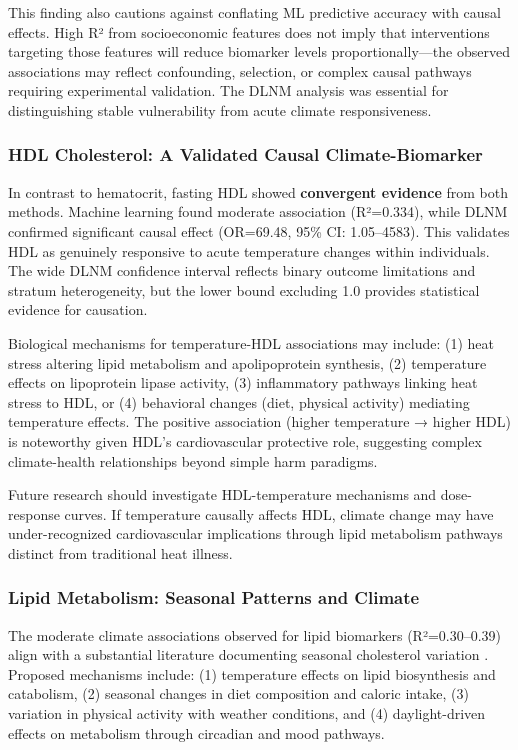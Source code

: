 This finding also cautions against conflating ML predictive accuracy with causal effects. High R² from socioeconomic features does not imply that interventions targeting those features will reduce biomarker levels proportionally---the observed associations may reflect confounding, selection, or complex causal pathways requiring experimental validation. The DLNM analysis was essential for distinguishing stable vulnerability from acute climate responsiveness.

\subsubsection{HDL Cholesterol: A Validated Causal Climate-Biomarker}

In contrast to hematocrit, fasting HDL showed \textbf{convergent evidence} from both methods. Machine learning found moderate association (R²=0.334), while DLNM confirmed significant causal effect (OR=69.48, 95\% CI: 1.05--4583). This validates HDL as genuinely responsive to acute temperature changes within individuals. The wide DLNM confidence interval reflects binary outcome limitations and stratum heterogeneity, but the lower bound excluding 1.0 provides statistical evidence for causation.

Biological mechanisms for temperature-HDL associations may include: (1) heat stress altering lipid metabolism and apolipoprotein synthesis, (2) temperature effects on lipoprotein lipase activity, (3) inflammatory pathways linking heat stress to HDL, or (4) behavioral changes (diet, physical activity) mediating temperature effects. The positive association (higher temperature → higher HDL) is noteworthy given HDL's cardiovascular protective role, suggesting complex climate-health relationships beyond simple harm paradigms.

Future research should investigate HDL-temperature mechanisms and dose-response curves. If temperature causally affects HDL, climate change may have under-recognized cardiovascular implications through lipid metabolism pathways distinct from traditional heat illness.

\subsubsection{Lipid Metabolism: Seasonal Patterns and Climate}

The moderate climate associations observed for lipid biomarkers (R²=0.30--0.39) align with a substantial literature documenting seasonal cholesterol variation \citep{ockene1990seasonal}. Proposed mechanisms include: (1) temperature effects on lipid biosynthesis and catabolism, (2) seasonal changes in diet composition and caloric intake, (3) variation in physical activity with weather conditions, and (4) daylight-driven effects on metabolism through circadian and mood pathways.

